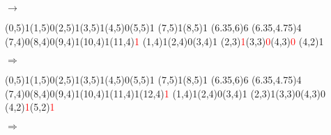 \documentclass[11pt,a4paper]{article}
\begin{document}
\begin{center}
\begin{table}[ht!]
\begin{minipage}{0.15\textwidth}
  \end{minipage}
  \hfillx
  \begin{minipage}{0.1\textwidth}
    \centering

$ \rightarrow $

  \end{minipage}
\end{table}

\begin{table}[ht!]
  \centering
  \begin{minipage}{0.2\textwidth}

\par\vspace{6\oplineheight}
\oplput(0,5){1}\oplput(1,5){0}\oplput(2,5){1}\oplput(3,5){1}\oplput(4,5){0}\oplput(5,5){1}
\oplput(7,5){1}\oplput(8,5){1}
\opvline(6.35,6){6}
\ophline(6.35,4.75){4}
\oplput(7,4){0}\oplput(8,4){0}\oplput(9,4){1}\oplput(10,4){1}\oplput(11,4){\textcolor{red}{1}}
\oplput(1,4){1}\oplput(2,4){0}\oplput(3,4){1}
\oplput(2,3){\textcolor{red}{1}}\oplput(3,3){\textcolor{red}{0}}\oplput(4,3){\textcolor{red}{0}}
\oplput(4,2){1}

  \end{minipage}
  \hfillx
  \begin{minipage}{0.1\textwidth}
    \centering

$ \Rightarrow $

  \end{minipage}
  \hfillx
  \begin{minipage}{0.25\textwidth}

\par\vspace{6\oplineheight}
\oplput(0,5){1}\oplput(1,5){0}\oplput(2,5){1}\oplput(3,5){1}\oplput(4,5){0}\oplput(5,5){1}
\oplput(7,5){1}\oplput(8,5){1}
\opvline(6.35,6){6}
\ophline(6.35,4.75){4}
\oplput(7,4){0}\oplput(8,4){0}\oplput(9,4){1}\oplput(10,4){1}\oplput(11,4){1}\oplput(12,4){\textcolor{red}{1}}
\oplput(1,4){1}\oplput(2,4){0}\oplput(3,4){1}
\oplput(2,3){1}\oplput(3,3){0}\oplput(4,3){0}
\oplput(4,2){\textcolor{red}{1}}\oplput(5,2){\textcolor{red}{1}}

  \end{minipage}
  \hfillx
  \begin{minipage}{0.1\textwidth}
    \centering

$ \Rightarrow $

  \end{minipage}
  \hfillx
  \begin{minipage}{0.2\textwidth}


\end{minipage}
\end{table}
\end{center}
\end{document}
